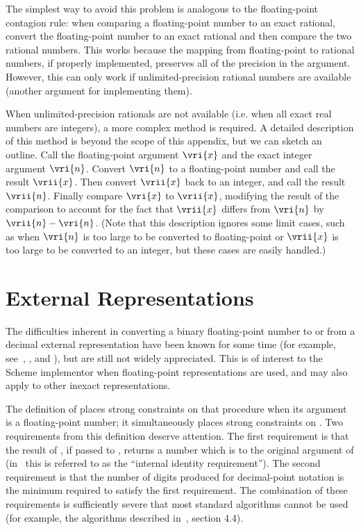 The simplest way to avoid this problem is analogous to the
floating-point contagion rule: when comparing a floating-point number
to an exact rational, convert the floating-point number to an exact
rational and then compare the two rational numbers.  This works
because the mapping from floating-point to rational numbers, if
properly implemented, preserves all of the precision in the argument.
However, this can only work if unlimited-precision rational numbers
are available (another argument for implementing them).

When unlimited-precision rationals are not available (i.e. when all
exact real numbers are integers), a more complex method is required.
A detailed description of this method is beyond the scope of this
appendix, but we can sketch an outline.  Call the floating-point
argument $\vri{x}$ and the exact integer argument $\vri{n}$.  Convert
$\vri{n}$ to a floating-point number and call the result $\vrii{x}$.
Then convert $\vrii{x}$ back to an integer, and call the result
$\vrii{n}$.  Finally compare $\vri{x}$ to $\vrii{x}$, modifying the
result of the comparison to account for the fact that $\vrii{x}$
differs from $\vri{n}$ by $\vrii{n}-\vri{n}$.  (Note that this
description ignores some limit cases, such as when $\vri{n}$ is too
large to be converted to floating-point or $\vrii{x}$ is too large to
be converted to an integer, but these cases are easily handled.)

\section{External Representations}

The difficulties inherent in converting a binary floating-point number
to or from a decimal external representation have been known for some
time (for example, see~\cite{Matula68}, \cite{Matula70}, and
\cite{Heuristic}), but are still not widely appreciated.  This is of
interest to the Scheme implementor when floating-point representations
are used, and may also apply to other inexact representations.

The definition of  places strong constraints on
that procedure when its argument is a floating-point number; it
simultaneously places strong constraints on .  Two
requirements from this definition deserve attention.  The first
requirement is that the result of , if passed to
, returns a number which is  to the
original argument of  (in~\cite{Heuristic} this is
referred to as the ``internal identity requirement'').  The second
requirement is that the number of digits produced for decimal-point
notation is the minimum required to satisfy the first requirement.
The combination of these requirements is sufficiently severe that most
standard algorithms cannot be used (for example, the algorithms
described in~\cite{Knuth}, section 4.4).

